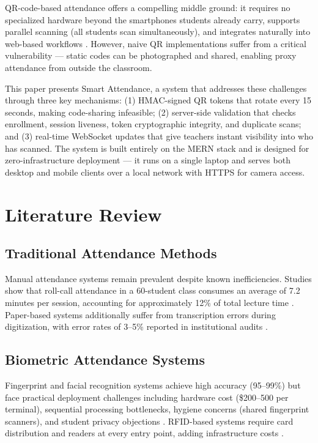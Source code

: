 \documentclass[conference]{IEEEtran}
\begin{document}
QR-code-based attendance offers a compelling middle ground: it requires no specialized hardware beyond the smartphones students already carry, supports parallel scanning (all students scan simultaneously), and integrates naturally into web-based workflows \cite{b3}. However, naive QR implementations suffer from a critical vulnerability --- static codes can be photographed and shared, enabling proxy attendance from outside the classroom.

This paper presents Smart Attendance, a system that addresses these challenges through three key mechanisms: (1) HMAC-signed QR tokens that rotate every 15 seconds, making code-sharing infeasible; (2) server-side validation that checks enrollment, session liveness, token cryptographic integrity, and duplicate scans; and (3) real-time WebSocket updates that give teachers instant visibility into who has scanned. The system is built entirely on the MERN stack and is designed for zero-infrastructure deployment --- it runs on a single laptop and serves both desktop and mobile clients over a local network with HTTPS for camera access.

\section{Literature Review}

\subsection{Traditional Attendance Methods}
Manual attendance systems remain prevalent despite known inefficiencies. Studies show that roll-call attendance in a 60-student class consumes an average of 7.2 minutes per session, accounting for approximately 12\% of total lecture time \cite{b1}. Paper-based systems additionally suffer from transcription errors during digitization, with error rates of 3--5\% reported in institutional audits \cite{b4}.

\subsection{Biometric Attendance Systems}
Fingerprint and facial recognition systems achieve high accuracy (95--99\%) but face practical deployment challenges including hardware cost (\$200--500 per terminal), sequential processing bottlenecks, hygiene concerns (shared fingerprint scanners), and student privacy objections \cite{b2}. RFID-based systems require card distribution and readers at every entry point, adding infrastructure costs \cite{b5}.
\end{document}

